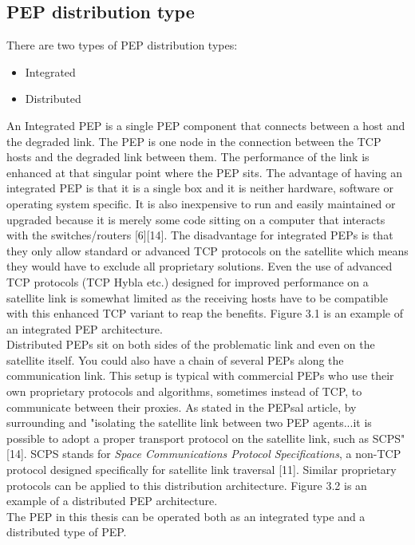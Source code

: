\documentclass{uathesis}
\begin{document}
\subsection{PEP distribution type}
There are two types of PEP distribution types:\\
\begin{itemize}
\item Integrated 
\item Distributed\\
\end{itemize}
An Integrated PEP is a single PEP component that connects between a host and the degraded link. The PEP is one node in the connection between the TCP hosts and the degraded link between them. The performance of the link is enhanced at that singular point where the PEP sits. The advantage of having an integrated PEP is that it is a single box and it is neither hardware, software or operating system specific. It is also inexpensive to run and easily maintained or upgraded because it is merely some code sitting on a computer that interacts with the switches/routers [6][14]. The disadvantage for integrated PEPs is that they only allow standard or advanced TCP protocols on the satellite which means they would have to exclude all proprietary solutions. Even the use of advanced TCP protocols (TCP Hybla etc.) designed for improved performance on a satellite link is somewhat limited as the receiving hosts have to be compatible with this enhanced TCP variant to reap the benefits. Figure 3.1 is an example of an integrated PEP architecture.\\

Distributed PEPs sit on both sides of the problematic link and even on the satellite itself. You could also have a chain of several PEPs along the communication link. This setup is typical with commercial PEPs who use their own proprietary protocols and algorithms, sometimes instead of TCP, to communicate between their proxies. As stated in the PEPsal article, by surrounding and "isolating the satellite link between two PEP agents...it is possible to adopt a proper transport protocol on the satellite link, such as SCPS"[14]. SCPS stands for \emph{Space Communications Protocol Specifications}, a non-TCP protocol designed specifically for satellite link traversal [11]. Similar proprietary protocols can be applied to this distribution architecture. Figure 3.2 is an example of a distributed PEP architecture.\\

The PEP in this thesis can be operated both as an integrated type and a distributed type of PEP. 
 
\end{document}
